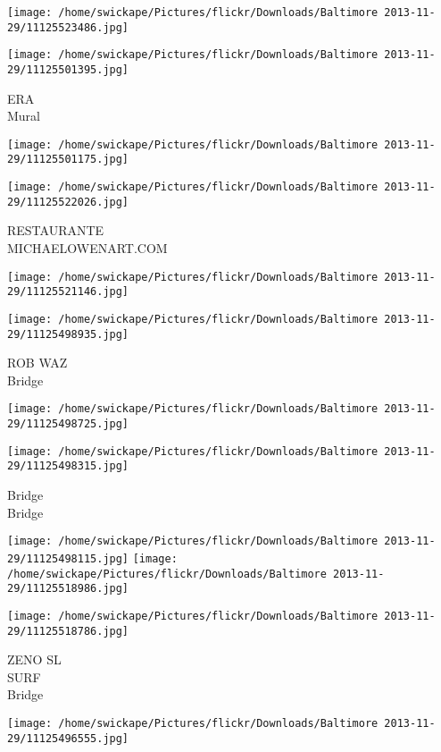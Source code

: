 \documentclass[10pt,letterpaper]{article}
\begin{document}
\texttt{[image: /home/swickape/Pictures/flickr/Downloads/Baltimore 2013-11-29/11125523486.jpg]}

\vspace{0.25in}
\texttt{[image: /home/swickape/Pictures/flickr/Downloads/Baltimore 2013-11-29/11125501395.jpg]}

ERA\\
Mural
\pagebreak

\texttt{[image: /home/swickape/Pictures/flickr/Downloads/Baltimore 2013-11-29/11125501175.jpg]}

\vspace{0.25in}
\texttt{[image: /home/swickape/Pictures/flickr/Downloads/Baltimore 2013-11-29/11125522026.jpg]}

RESTAURANTE\\
MICHAELOWENART.COM
\pagebreak

\texttt{[image: /home/swickape/Pictures/flickr/Downloads/Baltimore 2013-11-29/11125521146.jpg]}

\vspace{0.25in}
\texttt{[image: /home/swickape/Pictures/flickr/Downloads/Baltimore 2013-11-29/11125498935.jpg]}

ROB WAZ\\
Bridge
\pagebreak

\texttt{[image: /home/swickape/Pictures/flickr/Downloads/Baltimore 2013-11-29/11125498725.jpg]}

\vspace{0.25in}
\texttt{[image: /home/swickape/Pictures/flickr/Downloads/Baltimore 2013-11-29/11125498315.jpg]}

Bridge\\
Bridge
\pagebreak

\texttt{[image: /home/swickape/Pictures/flickr/Downloads/Baltimore 2013-11-29/11125498115.jpg]}
\texttt{[image: /home/swickape/Pictures/flickr/Downloads/Baltimore 2013-11-29/11125518986.jpg]}

\vspace{0.25in}
\texttt{[image: /home/swickape/Pictures/flickr/Downloads/Baltimore 2013-11-29/11125518786.jpg]}

ZENO SL\\
SURF\\
Bridge
\pagebreak

\texttt{[image: /home/swickape/Pictures/flickr/Downloads/Baltimore 2013-11-29/11125496555.jpg]}
\end{document}
